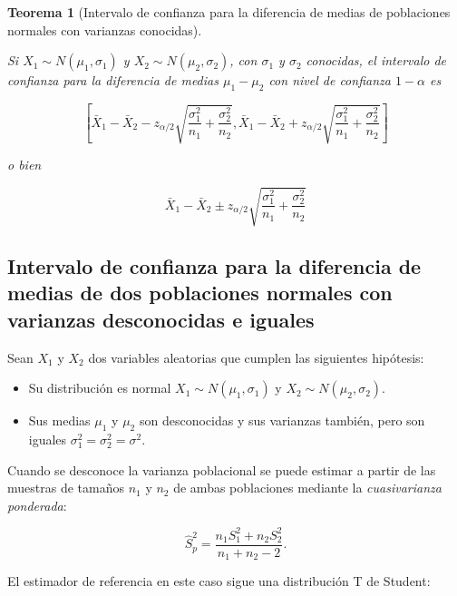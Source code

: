 \documentclass[
  spanish,
  a4paper,
]{scrreport}
\providecommand{\tightlist}{%
  \setlength{\itemsep}{0pt}\setlength{\parskip}{0pt}}
\theoremstyle{plain}
\newtheorem{theorem}{Teorema}[chapter]
\theoremstyle{definition}
\theoremstyle{definition}
\theoremstyle{remark}
\begin{document}
\begin{theorem}[Intervalo de confianza para la diferencia de medias de
poblaciones normales con varianzas
conocidas]\protect\hypertarget{thm-intervalo-confianza-diferencia-medias-normales-varianzas-conocidas}{}\label{thm-intervalo-confianza-diferencia-medias-normales-varianzas-conocidas}

Si \(X_1\sim N(\mu_1,\sigma_1)\) y \(X_2\sim N(\mu_2,\sigma_2)\), con
\(\sigma_1\) y \(\sigma_2\) conocidas, el \emph{intervalo de confianza
para la diferencia de medias} \(\mu_1-\mu_2\) con nivel de confianza
\(1-\alpha\) es

\[
\left[\bar{X}_1-\bar{X}_2-z_{\alpha/2}\sqrt{\frac{\sigma^2_1}{n_1}+\frac{\sigma^2_2}{n_2}},\bar{X}_1-\bar{X}_2+z_{\alpha/2}\sqrt{\frac{\sigma^2_1}{n_1}+\frac{\sigma^2_2}{n_2}}\right]
\]

o bien

\[
\bar{X}_1-\bar{X}_2\pm z_{\alpha/2}\sqrt{\frac{\sigma^2_1}{n_1}+\frac{\sigma^2_2}{n_2}}
\]

\end{theorem}

\subsection{Intervalo de confianza para la diferencia de medias de dos
poblaciones normales con varianzas desconocidas e
iguales}\label{intervalo-de-confianza-para-la-diferencia-de-medias-de-dos-poblaciones-normales-con-varianzas-desconocidas-e-iguales}

Sean \(X_1\) y \(X_2\) dos variables aleatorias que cumplen las
siguientes hipótesis:

\begin{itemize}
\tightlist
\item
  Su distribución es normal \(X_1\sim N(\mu_1,\sigma_1)\) y
  \(X_2\sim N(\mu_2,\sigma_2)\).
\item
  Sus medias \(\mu_1\) y \(\mu_2\) son desconocidas y sus varianzas
  también, pero son iguales \(\sigma^2_1=\sigma^2_2=\sigma^2\).
\end{itemize}

Cuando se desconoce la varianza poblacional se puede estimar a partir de
las muestras de tamaños \(n_1\) y \(n_2\) de ambas poblaciones mediante
la \emph{cuasivarianza ponderada}:

\[
\hat{S}^2_p = \frac{n_1S^2_1+n_2S^2_2}{n_1+n_2-2}.
\]

El estimador de referencia en este caso sigue una distribución T de
Student:
\end{document}
